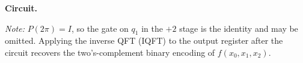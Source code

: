 \documentclass{ceri/sty/rapport}
\begin{document}
\begin{solution}
\medskip\noindent\textbf{Circuit.}
\noindent{}

\noindent\textit{Note:} $P(2\pi) = I$, so the gate on $q_1$ in the $+2$ stage is
the identity and may be omitted.
Applying the inverse QFT (IQFT) to the output register after the circuit recovers
the two's-complement binary encoding of $f(x_0, x_1, x_2)$.
\end{solution}
\end{document}

